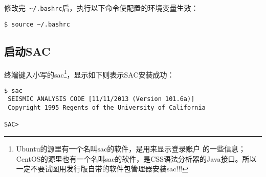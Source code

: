 修改完~\verb+~/.bashrc+后，执行以下命令使配置的环境变量生效：
\begin{verbatim}
$ source ~/.bashrc
\end{verbatim}

\subsection*{启动SAC}
终端键入小写的sac\footnote{Ubuntu的源里有一个名叫sac的软件，是用来显示登录账户
的一些信息；CentOS的源里也有一个名叫sac的软件，是CSS语法分析器的Java接口。所以
一定不要试图用发行版自带的软件包管理器安装sac!!!}，显示如下则表示SAC安装成功：
\begin{verbatim}
$ sac
 SEISMIC ANALYSIS CODE [11/11/2013 (Version 101.6a)]
 Copyright 1995 Regents of the University of California

SAC>
\end{verbatim}
